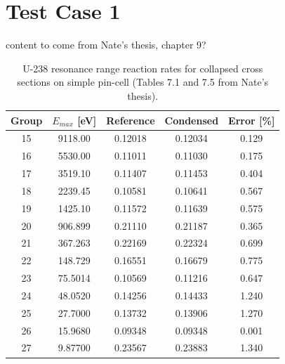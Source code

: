 \section{Test Case 1}
\label{sec:test-case1}

{\color{red} content to come from Nate's thesis, chapter 9?}

\begin{table}[h!]
  \centering
  \caption{U-238 resonance range reaction rates for collapsed cross sections on simple pin-cell {(\color{red}Tables 7.1 and 7.5 from Nate's thesis)}.}
  \label{tab:case1-bias} 
  \begin{tabular}{c c c c c}
  \toprule
  \textbf{Group} & \textbf{\boldmath$E_{max}$ [eV]} & \textbf{Reference} & \textbf{Condensed} & \textbf{Error [\%]} \\
  \midrule
  15 & 9118.00 & 0.12018 & 0.12034 & 0.129 \\
  16 & 5530.00 & 0.11011 & 0.11030 & 0.175 \\
  17 & 3519.10 & 0.11407 & 0.11453 & 0.404 \\
  18 & 2239.45 & 0.10581 & 0.10641 & 0.567 \\
  19 & 1425.10 & 0.11572 & 0.11639 & 0.575 \\
  20 & 906.899 & 0.21110 & 0.21187 & 0.365 \\
  21 & 367.263 & 0.22169 & 0.22324 & 0.699 \\
  22 & 148.729 & 0.16551 & 0.16679 & 0.775 \\
  23 & 75.5014 & 0.10569 & 0.11216 & 0.647 \\
  24 & 48.0520 & 0.14256 & 0.14433 & 1.240 \\
  25 & 27.7000 & 0.13732 & 0.13906 & 1.270 \\
  26 & 15.9680 & 0.09348 & 0.09348 & 0.001 \\
  27 & 9.87700 & 0.23567 & 0.23883 & 1.340 \\
  \bottomrule
\end{tabular}
\end{table}

